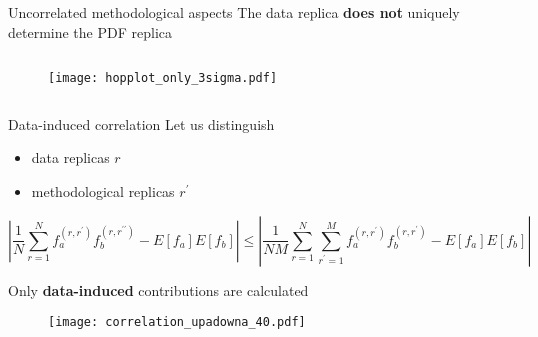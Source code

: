 \begin{frame}[t]{Uncorrelated methodological aspects}
  The data replica {\bf does not} uniquely determine the PDF replica
  \begin{columns}
    \begin{column}{0.49\textwidth}
      \begin{figure}
        \texttt{[image: hopplot\_only\_3sigma.pdf]}
      \end{figure}
    \end{column}
    \begin{column}{0.49\textwidth}
    \end{column}
  \end{columns}
\end{frame}



\begin{frame}[t]{Data-induced correlation}
  Let us distinguish
  \begin{itemize}
    \item data replicas $r$
    \item methodological replicas $r^\prime$
  \end{itemize}
  $$
  \left|\frac{1}{N} \sum_{r=1}^N f_a^{\left(r, r^{\prime}\right)} f_b^{\left(r, r^{\prime \prime}\right)}-E\left[f_a\right] E\left[f_b\right]\right| \leq\left|\frac{1}{N M} \sum_{r=1}^N \sum_{r^{\prime}=1}^M f_a^{\left(r, r^{\prime}\right)} f_b^{\left(r, r^{\prime}\right)}-E\left[f_a\right] E\left[f_b\right]\right|
  $$

  \vspace*{0.3cm}
  Only {\bf data-induced} contributions are calculated
  \begin{figure}
    \centering
    \texttt{[image: correlation\_upadowna\_40.pdf]}
  \end{figure}

\end{frame}


